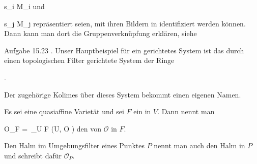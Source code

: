 \mavergleichskette
{\vergleichskette
{ s_i
}
{ \in }{  M_i
}
{  }{
}
{    }{
}
{   }{
}
}
{}{}{}
und

\mavergleichskette
{\vergleichskette
{ s_j
}
{ \in }{  M_j
}
{  }{
}
{    }{
}
{   }{
}
}
{}{}{}
repräsentiert seien, mit ihren Bildern in
 {} {}
identifiziert werden können. Dann kann man dort die Gruppenverknüpfung erklären, siehe

Aufgabe 15.23
.
Unser Hauptbeispiel für ein gerichtetes System ist das durch einen topologischen Filter gerichtete System der Ringe

 { . }

Der zugehörige Kolimes über dieses System bekommt einen eigenen Namen.


{}
{





Es sei
 eine quasiaffine Varietät und sei $F$ ein
in $V$. Dann nennt man

\mavergleichskettedisp
{\vergleichskette
{ {\mathcal O}_F
}
{ =} { \,_{U \in F} \Gamma (U, {\mathcal O} )
}
{ } {
}
{ } {
}
{ } {
}
}
{}{}{}
den  von ${\mathcal O}$ in $F$.





}

Den Halm im Umgebungsfilter eines Punktes $P$ nennt man auch den Halm in $P$ und schreibt dafür ${\mathcal O}_P$.





